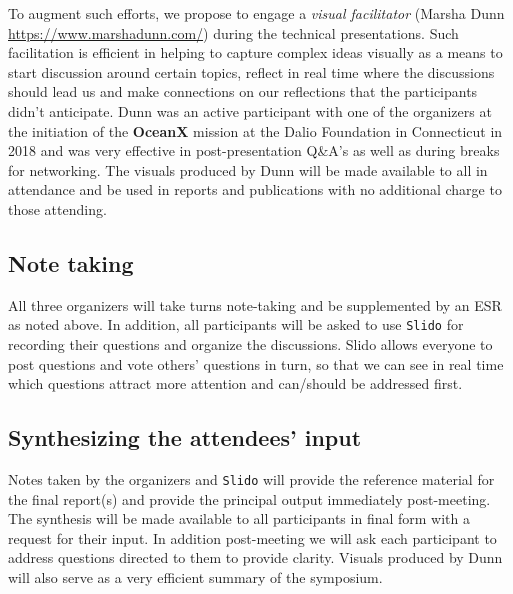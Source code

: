 
To augment such efforts, we propose to engage a \emph{visual
  facilitator} (Marsha Dunn \url{https://www.marshadunn.com/}) during
the technical presentations. Such facilitation is efficient in helping
to capture complex ideas visually as a means to start discussion
around certain topics, reflect in real time where the discussions
should lead us and make connections on our reflections that the
participants didn't anticipate. Dunn was an active participant with
one of the organizers at the initiation of the \textbf{OceanX} mission
at the Dalio Foundation in Connecticut in 2018 and was very effective
in post-presentation Q\&A's as well as during breaks for
networking. The visuals produced by Dunn will be made available to all
in attendance and be used in reports and publications with no
additional charge to those attending.
 
\subsection{Note taking}

All three organizers will take turns note-taking and be supplemented by
an ESR as noted above. In addition, all participants will be asked to
use \texttt{Slido} for recording their questions and organize the
discussions. Slido allows everyone to post questions and vote others'
questions in turn, so that we can see in real time which questions
attract more attention and can/should be addressed first.
 
 
\subsection{Synthesizing the attendees’ input}

Notes taken by the organizers and \texttt{Slido} will provide the
reference material for the final report(s) and provide the principal
output immediately post-meeting. The synthesis will be made available to
all participants in final form with a request for their input. In
addition post-meeting we will ask each participant to address questions
directed to them to provide clarity. Visuals produced by Dunn will also
serve as a very efficient summary of the symposium.

